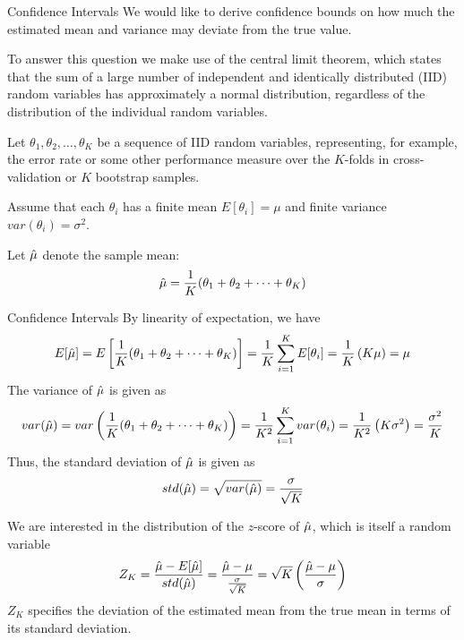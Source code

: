 \begin{frame}{Conf\/{i}dence Intervals}
We would like to derive conf\/{i}dence bounds on how
much the estimated mean and variance may deviate from the true value.

\medskip
To answer this question we make use of the
central limit theorem, which states that the sum of a large number of
independent and identically distributed (IID) random variables has
approximately a normal distribution, regardless of the distribution of
the individual random variables. 

\medskip
Let $\theta_1, \theta_2, \ldots,
\theta_K$ be a sequence of IID random variables,
representing, for example, the error rate or some other performance
measure over the $K$-folds in cross-validation or $K$ bootstrap samples.

\medskip
Assume that each $\theta_i$ has a f\/{i}nite mean
$E[\theta_i] = \mu$ and f\/{i}nite variance $var(\theta_i) = \sigma^2$.

\medskip
Let $\hat{\mu}$ denote the sample mean:
\begin{align*}
  \hat{\mu} = {1\over K} (\theta_1 + \theta_2 + \cdots + \theta_K)
\end{align*}
\end{frame}


\begin{frame}{Conf\/{i}dence Intervals}
By linearity of expectation, we have
\begin{align*}
  E[\hat{\mu}] = E\left[{1\over K} (\theta_1 + \theta_2 + \cdots + \theta_K)\right] =
  {1\over K} \sum_{i=1}^K E[\theta_i] = {1\over K} \left(K\mu\right) = \mu
\end{align*}
The
variance of $\hat{\mu}$ is given as
\begin{align*}
  var(\hat{\mu}) = var\left({1\over K} (\theta_1 + \theta_2 + \cdots +
  \theta_K)\right)
  = {1 \over K^2} \sum_{i=1}^K var(\theta_i) =
  {1 \over K^2} \left(K\sigma^2\right)
  ={\sigma^2 \over K}
\end{align*}
Thus, the standard deviation of $\hat{\mu}$ is given as
\begin{align*}
  std(\hat{\mu})  = \sqrt{var(\hat{\mu})} = {\sigma \over \sqrt{K}}
\end{align*}

\medskip
We are interested in the distribution of the $z$-score of $\hat{\mu}$,
which is itself a random variable
\begin{align*}
  Z_K = {\hat{\mu} - E[\hat{\mu}] \over std(\hat{\mu})} = {\hat{\mu} - \mu \over
  \frac{\sigma}{\sqrt{K}}} = \sqrt{K} \left({\hat{\mu} - \mu \over \sigma}\right)
\end{align*}
$Z_K$ specif\/{i}es the deviation of the estimated mean from the true
mean in terms of its standard deviation. 
\end{frame}


